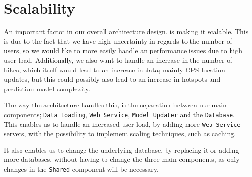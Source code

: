 \section{Scalability}
An important factor in our overall architecture design, is making it scalable.
This is due to the fact that we have high uncertainty in regards to the number of users, so we would like to more easily handle an performance issues due to high user load.
Additionally, we also want to handle an increase in the number of bikes, which itself would lead to an increase in data; mainly GPS location updates, but this could possibly also lead to an increase in hotspots and prediction model complexity.

The way the architecture handles this, is the separation between our main components; \texttt{Data Loading}, \texttt{Web Service}, \texttt{Model Updater} and the \texttt{Database}.
This enables us to handle an increased user load, by adding more \texttt{Web Service} servers, with the possibility to implement scaling techniques, such as caching.\cite{scalability}

It also enables us to change the underlying database, by replacing it or adding more databases, without having to change the three main components, as only changes in the \texttt{Shared} component will be necessary.
